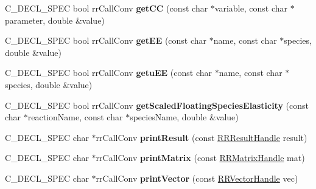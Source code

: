 \begin{DoxyCompactItemize}
\item 
\hypertarget{group__loadsave_ga49c703842a069c37fa472f2740dd514b}{
\-C\-\_\-\-D\-E\-C\-L\-\_\-\-S\-P\-E\-C bool rr\-Call\-Conv {\bfseries get\-C\-C} (const char $\ast$variable, const char $\ast$parameter, double \&value)}
\label{group__loadsave_ga49c703842a069c37fa472f2740dd514b}

\item 
\hypertarget{group__loadsave_ga761a98e3635d75c8505f516a0b2384b1}{
\-C\-\_\-\-D\-E\-C\-L\-\_\-\-S\-P\-E\-C bool rr\-Call\-Conv {\bfseries get\-E\-E} (const char $\ast$name, const char $\ast$species, double \&value)}
\label{group__loadsave_ga761a98e3635d75c8505f516a0b2384b1}

\item 
\hypertarget{group__loadsave_gadf71d426da852cdf931022fa56a3acb0}{
\-C\-\_\-\-D\-E\-C\-L\-\_\-\-S\-P\-E\-C bool rr\-Call\-Conv {\bfseries getu\-E\-E} (const char $\ast$name, const char $\ast$species, double \&value)}
\label{group__loadsave_gadf71d426da852cdf931022fa56a3acb0}

\item 
\hypertarget{group__loadsave_ga8f7a0a9f82d038a325c5e38f7596a0d1}{
\-C\-\_\-\-D\-E\-C\-L\-\_\-\-S\-P\-E\-C bool rr\-Call\-Conv {\bfseries get\-Scaled\-Floating\-Species\-Elasticity} (const char $\ast$reaction\-Name, const char $\ast$species\-Name, double \&value)}
\label{group__loadsave_ga8f7a0a9f82d038a325c5e38f7596a0d1}

\item 
\hypertarget{group__loadsave_ga40c29c6c6773091005de86df2b8a7b6b}{
\-C\-\_\-\-D\-E\-C\-L\-\_\-\-S\-P\-E\-C char $\ast$rr\-Call\-Conv {\bfseries print\-Result} (const \hyperlink{rr__c__types_8h_a8c364bbdef9aab31c89655c38461da51}{\-R\-R\-Result\-Handle} result)}
\label{group__loadsave_ga40c29c6c6773091005de86df2b8a7b6b}

\item 
\hypertarget{group__loadsave_ga61de73039780b4036d73922a1560f5e8}{
\-C\-\_\-\-D\-E\-C\-L\-\_\-\-S\-P\-E\-C char $\ast$rr\-Call\-Conv {\bfseries print\-Matrix} (const \hyperlink{rr__c__types_8h_a87174eefa58ae98dec58c9253ae6c5da}{\-R\-R\-Matrix\-Handle} mat)}
\label{group__loadsave_ga61de73039780b4036d73922a1560f5e8}

\item 
\hypertarget{group__loadsave_ga577d45215017692493baa428444f1f57}{
\-C\-\_\-\-D\-E\-C\-L\-\_\-\-S\-P\-E\-C char $\ast$rr\-Call\-Conv {\bfseries print\-Vector} (const \hyperlink{rr__c__types_8h_aea46a16752b0ae2cd95c009030ee630e}{\-R\-R\-Vector\-Handle} vec)}
\label{group__loadsave_ga577d45215017692493baa428444f1f57}


\end{DoxyCompactItemize}

